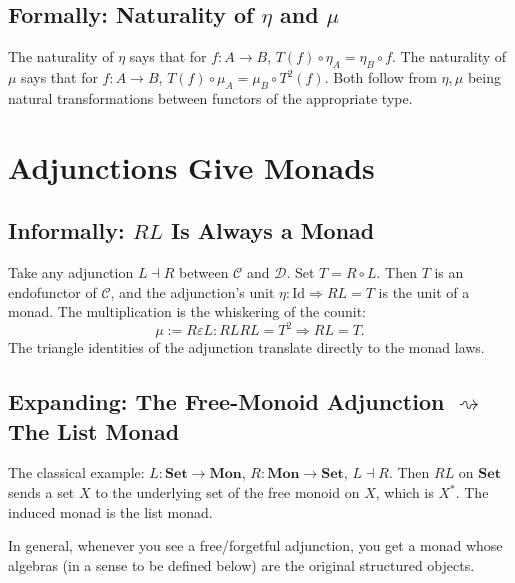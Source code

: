 \subsection{Formally: Naturality of $\eta$ and $\mu$}

The naturality of $\eta$ says that for $f : A \to B$,
$T(f) \circ \eta_A = \eta_B \circ f$. The naturality of $\mu$ says that
for $f : A \to B$, $T(f) \circ \mu_A = \mu_B \circ T^2(f)$. Both follow
from $\eta, \mu$ being natural transformations between functors of the
appropriate type.


\section{Adjunctions Give Monads}
\label{sec:adj-to-monad}

\subsection{Informally: $R L$ Is Always a Monad}

Take any adjunction $L \dashv R$ between $\mathcal{C}$ and $\mathcal{D}$.
Set $T = R \circ L$. Then $T$ is an endofunctor of $\mathcal{C}$, and the
adjunction's unit $\eta : \mathrm{Id} \Rightarrow R L = T$ is the unit of
a monad. The multiplication is the whiskering of the counit:
\begin{equation*}
  \mu := R \varepsilon L : R L R L = T^2 \Rightarrow R L = T.
\end{equation*}
The triangle identities of the adjunction translate directly to the
monad laws.

\subsection{Expanding: The Free-Monoid Adjunction $\rightsquigarrow$ The List Monad}

The classical example: $L : \mathbf{Set} \to \mathbf{Mon}$, $R :
\mathbf{Mon} \to \mathbf{Set}$, $L \dashv R$. Then $R L$ on $\mathbf{Set}$
sends a set $X$ to the underlying set of the free monoid on $X$, which is
$X^*$. The induced monad is the list monad.

In general, whenever you see a free/forgetful adjunction, you get a monad
whose algebras (in a sense to be defined below) are the original
structured objects.

